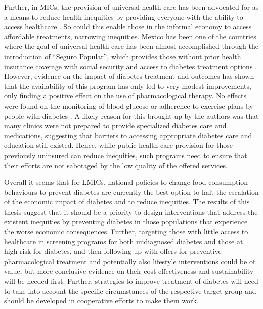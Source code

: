 Further, in \acp{MIC}, the provision of universal health care has been advocated for as a means to reduce health inequities by providing everyone with the ability to access healthcare \parencite{Marmot2008}. So could this enable those in the informal economy to access affordable treatments, narrowing inequities.  Mexico has been one of the countries where the goal of universal health care has been almost accomplished through the introduction of ``Seguro Popular'', which provides those without prior health insurance coverage with social security and access to diabetes treatment options \parencite{Knaul2012,Rivera-Hernandez2016}. However, evidence on the impact of diabetes treatment and outcomes has shown that the availability of this program has only led to very modest improvements, only finding a positive effect on the use of pharmacological therapy. No effects were found on the monitoring of blood glucose or adherence to exercise plans by people with diabetes \parencite{Rivera-Hernandez2016}. A likely reason for this brought up by the authors was that many clinics were not prepared to provide specialized diabetes care and medications, suggesting that barriers to accessing appropriate diabetes care and education still existed. Hence, while public health care provision for those previously uninsured can reduce inequities, such programs need to ensure that their efforts are not sabotaged by the low quality of the offered services.

Overall it seems that for \acp{LMIC}, national policies to change food consumption behaviours to prevent diabetes are currently the best option to halt the escalation of the economic impact of diabetes and to reduce inequities. The results of this thesis suggest that it should be a priority to design interventions that address the existent inequities by preventing diabetes in those populations that experience the worse economic consequences. Further, targeting those with little access to healthcare in screening programs for both undiagnosed diabetes and those at high-risk for diabetes, and then following up with offers for preventive pharmacological treatment and potentially also lifestyle interventions could be of value, but more conclusive evidence on their cost-effectiveness and sustainability will be needed first. Further, strategies to improve treatment of diabetes will need to take into account the specific circumstances of the respective target group and should be developed in cooperative efforts to make them work.



